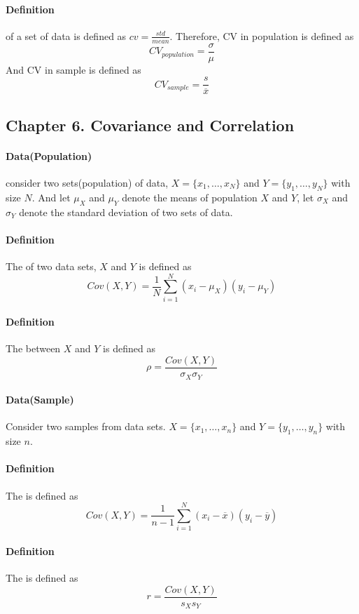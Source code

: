 \documentclass[11pt]{article}
\begin{document}
\paragraph{Definition}  of a set of data is defined as $cv = \frac{std}{mean}$. Therefore, CV in population is defined as
	\[
		CV_{population} = \frac{\sigma}{\mu}
	\]
	And CV in sample is defined as
	\[
		CV_{sample} = \frac{s}{\overline{x}}
	\]

\subsection{Chapter 6. Covariance and Correlation}
\paragraph{Data(Population)} consider two sets(population) of data, $X = \{x_1,\dots, x_N\}$ and $Y = \{y_1, \dots, y_N\}$ with size $N$. And let $\mu_X$ and $\mu_Y$ denote the means of population $X$ and $Y$, let $\sigma_X$ and $\sigma_Y$ denote the standard deviation of two sets of data.

\paragraph{Definition} The  of two data sets, $X$ and $Y$ is defined as
\[
	Cov(X,Y) = \frac{1}{N} \sum_{i=1}^N {(x_i - \mu_X)(y_i - \mu_Y)}
\]

\paragraph{Definition} The  between $X$ and $Y$ is defined as
\[
	\rho = \frac{Cov(X,Y)}{\sigma_X \sigma_Y}
\]

\paragraph{Data(Sample)} Consider two samples from data sets. $X = \{x_1, \dots, x_n\}$ and $Y = \{y_1, \dots, y_n\}$ with size $n$.

\paragraph{Definition} The  is defined as
\[
	Cov(X,Y) = \frac{1}{n-1} \sum_{i=1}^N {(x_i - \overline{x})(y_i - \overline{y})}
\]

\paragraph{Definition} The  is defined as 
\[
	r = \frac{Cov(X,Y)}{s_X s_Y}
\]
\end{document}
